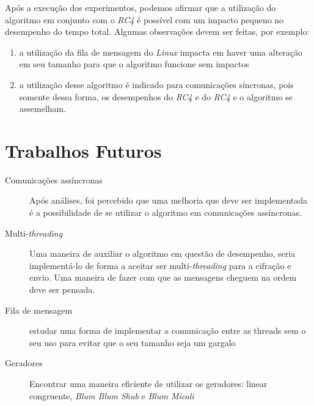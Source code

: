 Após a execução dos experimentos, podemos afirmar que a utilização do algoritmo em conjunto com o \textit{RC4} é possível com um impacto pequeno no desempenho do tempo total. Algumas observações devem ser feitas, por exemplo:

\begin{enumerate}
	\item a utilização da fila de mensagem do \textit{Linux} impacta em haver uma alteração em seu tamanho para que o algoritmo funcione sem impactos
	\item a utilização desse algoritmo é indicado para comunicações síncronas, pois somente dessa forma, os desempenhos do \textit{RC4} e do \textit{RC4} e o algoritmo se assemelham. 
\end{enumerate}

\section{Trabalhos Futuros}
\label{future-work}

	\begin{description}
		\item [Comunicações assíncronas] Após análises, foi percebido que uma melhoria que deve ser implementada é a possibilidade de se utilizar o algoritmo em comunicações assíncronas. 
		\item [Multi-\textit{threading}] Uma maneira de auxiliar o algoritmo em questão de desempenho, seria implementá-lo de forma a aceitar ser multi-\textit{threading} para a cifração e envio. Uma maneira de fazer com que as mensagens cheguem na ordem deve ser pensada.
		\item [Fila de mensagem] estudar uma forma de implementar a comunicação entre as threads sem o seu uso para evitar que o seu tamanho seja um gargalo
		\item [Geradores] Encontrar uma maneira eficiente de utilizar os geradores: linear congruente, \textit{Blum Blum Shub} e \textit{Blum Micali}
	\end{description}
	